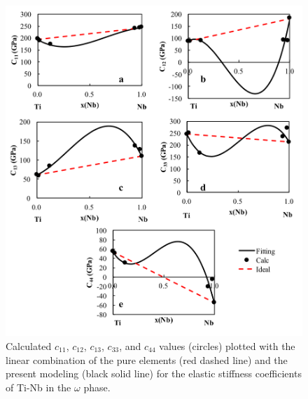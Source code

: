 \pagebreak
\begin{figure}[H]
	\centering
	\includegraphics[width=\textwidth]{Chapter-7/Figures/omegae1.png}
	\caption{Calculated $c_{11}$, $c_{12}$, $c_{13}$, $c_{33}$, and $c_{44}$ values (circles) plotted with the linear combination of the pure elements (red dashed line) and the present modeling (black solid line) for the elastic stiffness coefficients of Ti-Nb in the $\omega$ phase.}
	\label{Ch7-figure:omegae1}
\end{figure}

